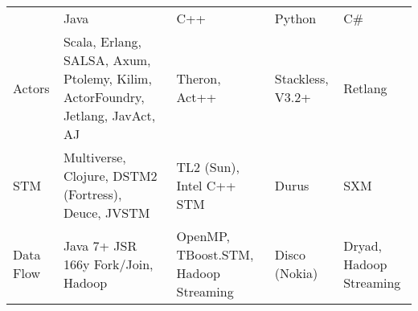 \documentclass{article}
\newcommand{\thickhline}{\noalign{\hrule height 1.0pt}}
\begin{document}
 
\pagestyle{empty}
\begin{center} 
\begin{tabular}{m{0.5in} m{1.2in} m{1in} m{1in} m{1in}}
  & Java & C++ & Python & C\# \\
\thickhline 
Actors &  Scala, Erlang, SALSA, Axum, Ptolemy, Kilim, ActorFoundry, Jetlang,
JavAct, AJ & Theron, Act++ & Stackless, V3.2+ & Retlang \\
 
STM & Multiverse, Clojure, DSTM2 (Fortress), Deuce, JVSTM & TL2 (Sun), Intel
C++ STM & Durus & SXM \\

Data Flow & Java 7+ JSR 166y Fork/Join, Hadoop & OpenMP, TBoost.STM, Hadoop Streaming &
Disco (Nokia) & Dryad, Hadoop Streaming \\
\end{tabular}
\end{center}
\end{document}
